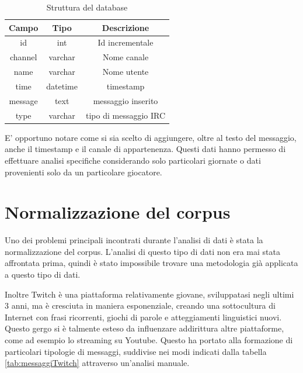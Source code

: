 \documentclass[a4paper,12pt,openright,twoside]{report}
\theoremstyle{definition}
\begin{document}
\begin{table}[h]
	\centering
	\begin{tabular}{|c|c|c|}
		\hline
		\textbf{Campo} &\textbf{ Tipo} & \textbf{Descrizione} \\
		\hline
		\hline
		id & int & Id incrementale \\
		\hline
		channel & varchar & Nome canale \\
		\hline
		name & varchar & Nome utente \\
		\hline
		time & datetime & timestamp \\
		\hline
		message & text & messaggio inserito \\
		\hline
		type & varchar & tipo di messaggio IRC \\
		\hline
	\end{tabular}
	\caption{Struttura del database}
	\label{tab:strutturaDB}
\end{table}

E' opportuno notare come si sia scelto di aggiungere, oltre al testo del messaggio, anche 
il timestamp e il canale di appartenenza. Questi dati hanno permesso di effettuare analisi
specifiche considerando solo particolari giornate o dati provenienti solo da un particolare giocatore.

\section{Normalizzazione del corpus}
Uno dei problemi principali incontrati durante l’analisi di dati è stata 
la normalizzazione del corpus. L'analisi di questo tipo di dati non era mai 
stata affrontata prima, quindi è stato impossibile trovare una metodologia già 
applicata a questo tipo di dati.

Inoltre Twitch è una piattaforma relativamente giovane, sviluppatasi negli ultimi 3 anni, 
ma è cresciuta in maniera esponenziale, creando una sottocultura di Internet con frasi 
ricorrenti, giochi di parole e atteggiamenti linguistici nuovi. 
Questo gergo si è talmente esteso da influenzare addirittura altre piattaforme, 
come ad esempio lo streaming su Youtube. 
Questo ha portato alla formazione di particolari tipologie di messaggi, 
suddivise nei modi indicati dalla tabella \ref{tab:messaggiTwitch}  attraverso un'analisi manuale.
\end{document}
